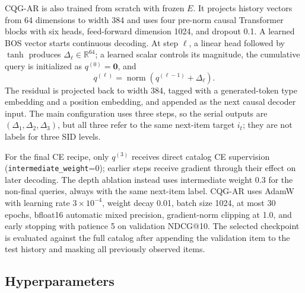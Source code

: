 \documentclass[letterpaper]{article}
\begin{document}
CQG-AR is also trained from scratch with frozen \(E\).  It projects history
vectors from 64 dimensions to width 384 and uses four pre-norm causal
Transformer blocks with six heads, feed-forward dimension 1024, and dropout
0.1.  A learned BOS vector starts continuous decoding.  At step \(\ell\), a
linear head followed by \(\tanh\) produces
\(\Delta_\ell\in\mathbb{R}^{64}\); a learned scalar controls its magnitude,
the cumulative query is initialized as \(q^{(0)}=\mathbf{0}\), and
\[
 q^{(\ell)}=\operatorname{norm}(q^{(\ell-1)}+\Delta_\ell).
\]
The residual is projected back to width 384, tagged with a generated-token
type embedding and a position embedding, and appended as the next causal
decoder input.  The main configuration uses three steps, so the serial
outputs are \((\Delta_1,\Delta_2,\Delta_3)\), but all three refer to the same
next-item target \(i_t\); they are not labels for three SID levels.

For the final CE recipe, only \(q^{(3)}\) receives direct catalog CE
supervision (\texttt{intermediate\_weight}=0); earlier steps receive gradient
through their effect on later decoding.  The depth ablation instead uses
intermediate weight 0.3 for the non-final queries, always with the same
next-item label.  CQG-AR uses AdamW with learning rate \(3\times10^{-4}\),
weight decay 0.01, batch size 1024, at most 30 epochs, bfloat16 automatic
mixed precision, gradient-norm clipping at 1.0, and early stopping with
patience 5 on validation NDCG@10.  The selected checkpoint is evaluated
against the full catalog after appending the validation item to the test
history and masking all previously observed items.



\subsection{Hyperparameters}
\label{app:hparams}
\end{document}
